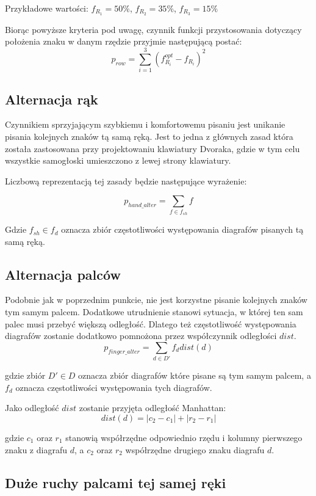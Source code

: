 \documentclass{xmgr}
\begin{document}
Przykładowe wartości: $f_{R_1} = 50\%$, $f_{R_2} = 35\%$, $f_{R_3} = 15\%$

Biorąc powyższe kryteria pod uwagę, czynnik funkcji przystosowania dotyczący położenia znaku w danym rzędzie przyjmie następującą postać:
$$ p_{row} = \sum\limits_{i = 1}^{3} (f_{R_i}^{opt} - f_{R_i})^2 $$


\subsection{Alternacja rąk}

Czynnikiem sprzyjającym szybkiemu i komfortowemu pisaniu jest unikanie pisania kolejnych znaków tą samą ręką. Jest to jedna z głównych zasad która została zastosowana przy projektowaniu klawiatury Dvoraka, gdzie w tym celu wszystkie samogłoski umieszczono z lewej strony klawiatury.

Liczbową reprezentacją tej zasady będzie następujące wyrażenie:

$$ p_{hand\_alter} = \sum\limits_{f \in f_{sh}} f $$

Gdzie $ f_{sh} \in f_d $ oznacza zbiór częstotliwości występowania diagrafów pisanych tą samą ręką.


\subsection{Alternacja palców}

Podobnie jak w poprzednim punkcie, nie jest korzystne pisanie kolejnych znaków tym samym palcem. Dodatkowe utrudnienie stanowi sytuacja, w której ten sam palec musi przebyć większą odległość. Dlatego też częstotliwość występowania diagrafów zostanie dodatkowo pomnożona przez współczynnik odległości $dist$.
$$ p_{finger\_alter} = \sum\limits_{d \in D'} f_d dist(d) $$

\noindent
gdzie zbiór $ D' \in D $ oznacza zbiór diagrafów które pisane są tym samym palcem, a $f_d$ oznacza częstotliwości występowania tych diagrafów.\newline

Jako odległość $dist$ zostanie przyjęta odległość Manhattan:
$$ dist(d) = |c_2 - c_1| + |r_2 - r_1| $$

gdzie $c_1$ oraz $r_1$ stanowią współrzędne odpowiednio rzędu i kolumny pierwszego znaku z diagrafu $d$, a $c_2$ oraz $r_2$ współrzędne drugiego znaku diagrafu $d$.


\subsection{Duże ruchy palcami tej samej ręki}
\end{document}
